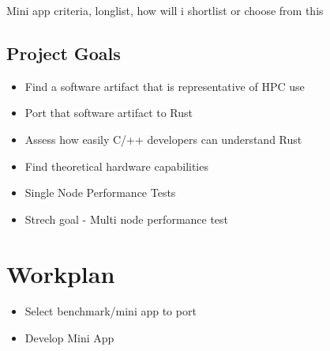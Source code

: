 \documentclass{article}[a4]
\begin{document}
Mini app criteria, longlist, how will i shortlist or choose from this
\subsection{Project Goals}
\begin{itemize}
  \item Find a software artifact that is representative of HPC use
  \item Port that software artifact to Rust
  \item Assess how easily C/++ developers can understand Rust
  \item Find theoretical hardware capabilities
  \item Single Node Performance Tests
  \item Strech goal - Multi node performance test
\end{itemize}
\section{Workplan} %
\begin{itemize}
  \item Select benchmark/mini app to port
  \item Develop Mini App
\end{itemize}
\end{document}
